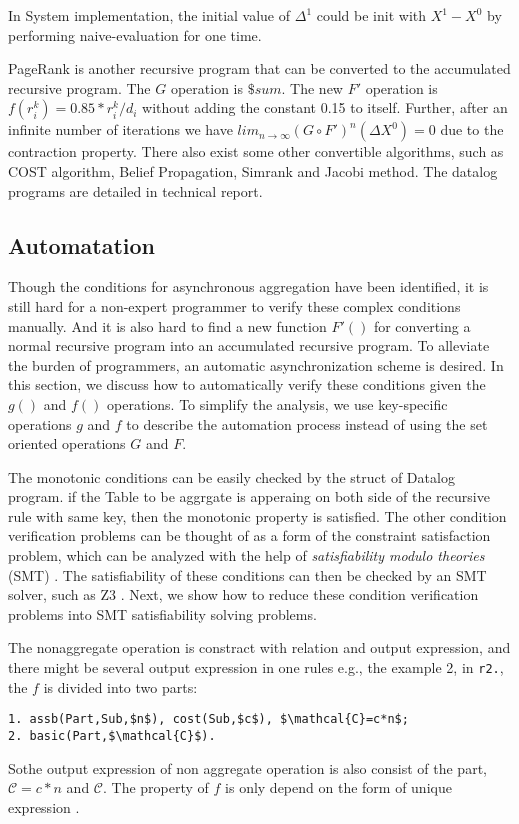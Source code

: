 In System implementation, the initial value of $\Delta^1$ could be init with $X^1-X^0$ by performing naive-evaluation for one time.

PageRank is another recursive program that can be converted to the accumulated recursive program. The $G$ operation is $\$sum$. The new $F'$ operation is $f(r_i^k)=0.85*r_i^k/d_i$ without adding the constant 0.15 to itself. Further, after an infinite number of iterations we have $lim_{n\rightarrow\infty}(G\circ F')^n(\Delta X^0)=0$ due to the contraction property. There also exist some other convertible algorithms, such as COST algorithm, Belief Propagation, Simrank and Jacobi method. The datalog programs are detailed in technical report\cite{fullversion}.





\subsection{Automatation}
Though the conditions for asynchronous aggregation have been identified, it is still hard for a non-expert programmer to verify these complex conditions manually. And it is also hard to find a new function $F'()$ for converting a normal recursive program into an accumulated recursive program.
 To alleviate the burden of programmers, an automatic asynchronization scheme is desired. In this section, we discuss how to automatically verify these conditions given the $g()$ and $f()$ operations. To simplify the analysis, we use key-specific operations $g$ and $f$ to describe the automation process instead of using the set oriented operations $G$ and $F$.
 
The monotonic conditions can be easily checked by the struct of Datalog program. if the Table to be aggrgate is apperaing on both side of the recursive rule with same key, then the monotonic property is satisfied. The other condition verification problems can be thought of as a form of the constraint satisfaction problem, which can be analyzed with the help of \emph{satisfiability modulo theories} (SMT) \cite{53e486195688442995f82bfe28c55731}. The satisfiability of these conditions can then be checked by an SMT solver, such as Z3 \cite{DeMoura:2008:ZES:1792734.1792766}. Next, we show how to reduce these condition verification problems into SMT satisfiability solving problems.

The nonaggregate operation is constract with relation and output expression, and there might be several output expression in one rules e.g., the example 2, in \texttt{r2.}, the $f$ is divided into two parts:
\begin{lstlisting}
1. assb(Part,Sub,$n$), cost(Sub,$c$), $\mathcal{C}=c*n$;
2. basic(Part,$\mathcal{C}$).
\end{lstlisting}
Sothe output expression of non aggregate operation is also consist of the part, $\mathcal{C}=c*n$ and  $\mathcal{C}$. The property of $f$ is only depend on the form of unique expression .


